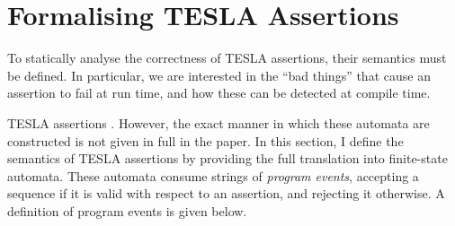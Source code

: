 



\section{Formalising TESLA Assertions} \label{sec:formal}

To statically analyse the correctness of TESLA assertions, their
semantics must be defined. In particular, we are interested in the ``bad
things'' that cause an assertion to fail at run time, and how these can
be detected at compile time.

TESLA assertions . However, the exact manner in which these automata are constructed is
not given in full in the paper. In this section, I define the semantics of TESLA
assertions by providing the full translation into finite-state automata. These
automata consume strings of \emph{program events}, accepting a sequence if it is
valid with respect to an assertion, and rejecting it otherwise. A definition of
program events is given below.

